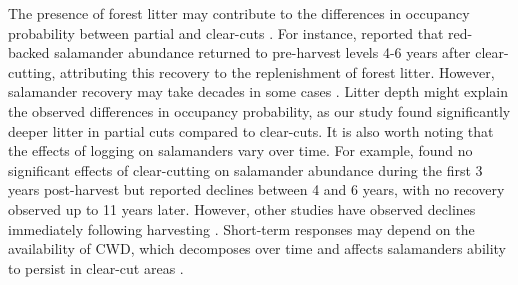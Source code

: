 The presence of forest litter may contribute to the differences in occupancy probability between partial and clear-cuts \citep{tilghmanMetaanalysisEffectsCanopy2012}. 
For instance, \cite{Ash1997DisappearanceReturn} reported that red-backed salamander abundance returned to pre-harvest levels 4-6 years after clear-cutting, attributing this recovery to the replenishment of forest litter. 
However, salamander recovery may take decades in some cases \citep{Homyack2013Effectsrepeatedstand,Ochs2022Responseterrestrial}. 
Litter depth might explain the observed differences in occupancy probability, as our study found significantly deeper litter in partial cuts compared to clear-cuts. 
It is also worth noting that the effects of logging on salamanders vary over time. 
For example, \cite{Ochs2022Responseterrestrial} found no significant effects of clear-cutting on salamander abundance during the first 3 years post-harvest but reported declines between 4 and 6 years, with no recovery observed up to 11 years later. 
However, other studies have observed declines immediately following harvesting \citep{deMaynadier1995relationshipforest,Macneil2014Effectstimber}. 
Short-term responses may depend on the availability of CWD, which decomposes over time and affects salamanders ability to persist in clear-cut areas \citep{Ochs2022Responseterrestrial}. 


